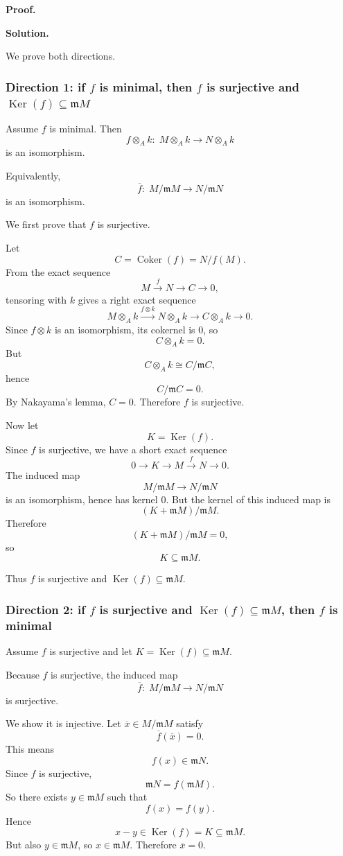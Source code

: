 \documentclass[12pt,a4paper]{article}
\theoremstyle{notespace}
\DeclareMathOperator{\Ker}{Ker}
\newcommand{\Coker}{\operatorname{Coker}}
\newcommand{\m}{\mathfrak m}
\begin{document}
\textbf{Proof.}

\textbf{Solution.}

We prove both directions.

\subsubsection{Direction 1: if \(f\) is minimal, then \(f\) is surjective and \(\Ker(f)\subseteq \m M\)}

Assume \(f\) is minimal. Then
\[
f\otimes_A k:\; M\otimes_A k \to N\otimes_A k
\]
is an isomorphism.

Equivalently,
\[
\overline f:\; M/\m M \to N/\m N
\]
is an isomorphism.

We first prove that \(f\) is surjective.

Let
\[
C=\Coker(f)=N/f(M).
\]
From the exact sequence
\[
M\xrightarrow{f} N \to C \to 0,
\]
tensoring with \(k\) gives a right exact sequence
\[
M\otimes_A k \xrightarrow{f\otimes k} N\otimes_A k \to C\otimes_A k \to 0.
\]
Since \(f\otimes k\) is an isomorphism, its cokernel is \(0\), so
\[
C\otimes_A k=0.
\]
But
\[
C\otimes_A k \cong C/\m C,
\]
hence
\[
C/\m C=0.
\]
By Nakayama's lemma, \(C=0\). Therefore \(f\) is surjective.

Now let
\[
K=\Ker(f).
\]
Since \(f\) is surjective, we have a short exact sequence
\[
0\to K \to M \xrightarrow{f} N \to 0.
\]
The induced map
\[
M/\m M \to N/\m N
\]
is an isomorphism, hence has kernel \(0\). But the kernel of this induced map is
\[
(K+\m M)/\m M.
\]
Therefore
\[
(K+\m M)/\m M=0,
\]
so
\[
K\subseteq \m M.
\]

Thus \(f\) is surjective and \(\Ker(f)\subseteq \m M\).

\subsubsection{Direction 2: if \(f\) is surjective and \(\Ker(f)\subseteq \m M\), then \(f\) is minimal}

Assume \(f\) is surjective and let \(K=\Ker(f)\subseteq \m M\).

Because \(f\) is surjective, the induced map
\[
\overline f:\; M/\m M \to N/\m N
\]
is surjective.

We show it is injective. Let \(\overline x\in M/\m M\) satisfy
\[
\overline f(\overline x)=0.
\]
This means
\[
f(x)\in \m N.
\]
Since \(f\) is surjective,
\[
\m N=f(\m M).
\]
So there exists \(y\in \m M\) such that
\[
f(x)=f(y).
\]
Hence
\[
x-y\in \Ker(f)=K\subseteq \m M.
\]
But also \(y\in \m M\), so \(x\in \m M\). Therefore \(\overline x=0\).
\end{document}

